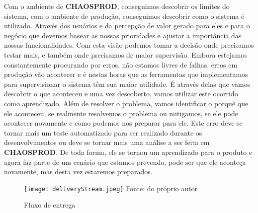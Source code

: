       Com o ambiente de \textbf{CHAOSPROD}, conseguimos descobrir os limites do
      sistema, com o ambiente de produção, conseguimos descobrir como o sistema é
      utilizado. Através dos usuários e da percepção de valor gerado para eles
      e para o negócio que devemos basear as nossas prioridades e ajustar a
      importância das nossas funcionalidades. Com esta visão podemos tomar a decisão
      onde precisamos testar mais, e também onde precisamos de maior supervisão.
      Embora estejamos constantemente procurando por erros, não estamos livres de
      falhas, erros em produção vão acontecer e é nestas horas que as ferramentas
      que implementamos para supervisionar o sistema têm sua maior utilidade. É
      através delas que vamos descobrir o que aconteceu e uma vez descoberto, vamos
      utilizar este ocorrido como aprendizado. Além de resolver o problema, vamos
      identificar o porquê que ele aconteceu, se realmente resolvemos o problema ou
      mitigamos, se ele pode acontecer novamente e como podemos nos preparar para
      ele. Este erro deve se tornar mais um teste automatizado para ser realizado
      durante os desenvolvimentos ou deve se tornar mais uma análise a ser feita em
      \textbf{CHAOSPROD}. De toda forma, ele se tornou um aprendizado para o produto
      e agora faz parte de um cenário que estamos prevendo, pode ser que ele
      aconteça novamente, mas desta vez estaremos preparados. \newline

      \begin{figure}[h!]
        \label{Imagem:4}
        \caption{Fluxo de entrega}
        \texttt{[image: deliveryStream.jpeg]}
        \newline
        \small{Fonte: do próprio autor}
      \end{figure}

